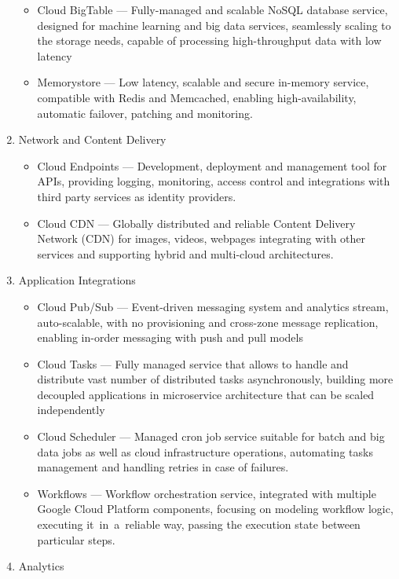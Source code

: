 \begin{enumerate}
\begin{itemize}
       \item Cloud BigTable --- Fully-managed and scalable NoSQL database service, designed for machine learning and big data services, seamlessly scaling to the storage needs, capable of processing high-throughput data with low latency
       \item Memorystore --- Low latency, scalable and secure in-memory service, compatible with Redis and Memcached, enabling high-availability, automatic failover, patching and monitoring.
   \end{itemize}
   \item Network and Content Delivery
   \begin{itemize}
       \item Cloud Endpoints --- Development, deployment and management tool for APIs, providing logging, monitoring, access control and integrations with third party services as identity providers.
       \item Cloud CDN --- Globally distributed and reliable Content Delivery Network (CDN) for images, videos, webpages integrating with other services and supporting hybrid and multi-cloud architectures.
   \end{itemize}
   \item Application Integrations
   \begin{itemize}
       \item Cloud Pub/Sub --- Event-driven messaging system and analytics stream, auto-scalable, with no provisioning and cross-zone message replication, enabling in-order messaging with push and pull models
       \item Cloud Tasks --- Fully managed service that allows to handle and distribute vast number of distributed tasks asynchronously, building more decoupled applications in microservice architecture that can be scaled independently
       \item Cloud Scheduler --- Managed cron job service suitable for batch and big data jobs as well as cloud infrastructure operations, automating tasks management and handling retries in case of failures.
       \item Workflows --- Workflow orchestration service, integrated with multiple Google Cloud Platform components, focusing on modeling workflow logic, executing it~in~a~reliable way, passing the execution state between particular steps.
   \end{itemize}
   \item Analytics
   \begin{itemize}

\end{itemize}
\end{enumerate}
